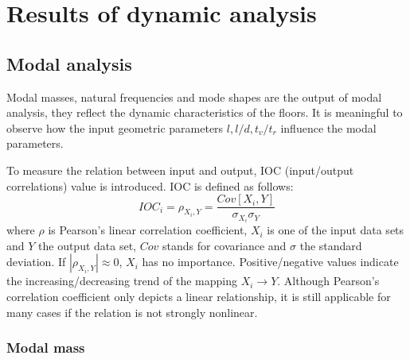 \chapter{Results of dynamic analysis}
\label{chap4}

\section{Modal analysis}
\label{sec:modal analysis}
Modal masses, natural frequencies and mode shapes are the output of modal analysis, they reflect the dynamic characteristics of the floors. It is meaningful to observe how the input geometric parameters $l, l/d, t_v/t_r$ influence the modal parameters.

To measure the relation between input and output, IOC (input/output correlations) value is introduced. IOC is defined as follows:
\begin{equation}
    IOC_i=\rho_{X_i,Y}=\frac{Cov[X_i,Y]}{\sigma_{X_i}\sigma_Y}
\end{equation}
\noindent
where $\rho$ is Pearson's linear correlation coefficient, $X_i$ is one of the input data sets and $Y$ the output data set, $Cov$ stands for covariance and $\sigma$ the standard deviation. If $|\rho_{X_i,Y}|\approx0$, $X_i$ has no importance. Positive/negative values indicate the increasing/decreasing trend of the mapping $X_i\xrightarrow{}Y$. Although Pearson's correlation coefficient only depicts a linear relationship, it is still applicable for many cases if the relation is not strongly nonlinear.

\subsection{Modal mass}
\label{subsec:modal_mass}

